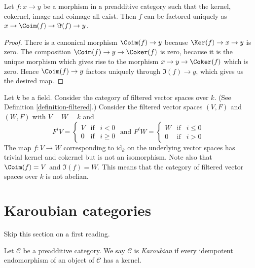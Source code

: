 \begin{lemma}
\label{lemma-coim-im-map}
Let $f : x \to y$ be a morphism in a preadditive category
such that the kernel, cokernel, image and coimage all exist.
Then $f$ can be factored uniquely as
$x \to \Coim(f) \to \Im(f) \to y$.
\end{lemma}

\begin{proof}
There is a canonical morphism $\Coim(f) \to y$
because $\Ker(f) \to x \to y$ is zero.
The composition $\Coim(f) \to y \to \Coker(f)$
is zero, because it is the unique morphism which gives
rise to the morphism $x \to y \to \Coker(f)$ which
is zero. Hence $\Coim(f) \to y$ factors uniquely through
$\Im(f) \to y$, which gives us the desired map.
\end{proof}

\begin{example}
\label{example-not-abelian}
Let $k$ be a field.
Consider the category
of filtered vector spaces over $k$.
(See Definition \ref{definition-filtered}.)
Consider the filtered vector spaces $(V, F)$ and $(W, F)$ with
$V = W = k$ and
$$
F^iV
=
\left\{
\begin{matrix}
V & \text{if} & i < 0 \\
0 & \text{if} & i \geq 0
\end{matrix}
\right.
\text{ and }
F^iW
=
\left\{
\begin{matrix}
W & \text{if} & i \leq 0 \\
0 & \text{if} & i > 0
\end{matrix}
\right.
$$
The map $f : V \to W$ corresponding to $\text{id}_k$ on the underlying
vector spaces has trivial kernel and cokernel but is not
an isomorphism. Note also that $\Coim(f) = V$ and $\Im(f) = W$.
This means that the category of filtered vector spaces over $k$
is not abelian.
\end{example}





\section{Karoubian categories}
\label{section-karoubian}

\noindent
Skip this section on a first reading.

\begin{definition}
\label{definition-karoubian}
Let $\mathcal{C}$ be a preadditive category. We say $\mathcal{C}$
is {\it Karoubian} if every idempotent endomorphism of an object
of $\mathcal{C}$ has a kernel.
\end{definition}

